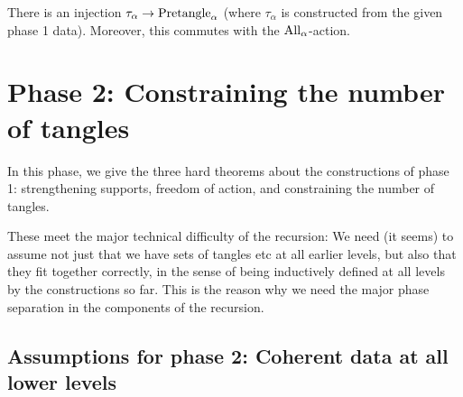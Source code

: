 \begin{definition}
  \label{def:embedding-into-pretangles}
  There is an injection $\tau_\alpha \to \mathrm{Pretangle}_\alpha$ (where $\tau_\alpha$ is constructed from the given phase 1 data).  Moreover, this commutes with the $\mathrm{All}_\alpha$-action.
\end{definition}

\newpage

\chapter{Phase 2: Constraining the number of tangles}

In this phase, we give the three hard theorems about the constructions of phase 1: strengthening supports, freedom of action, and constraining the number of tangles.

These meet the major technical difficulty of the recursion: We need (it seems) to assume not just that we have sets of tangles etc at all earlier levels, but also that they fit together correctly, in the sense of being inductively defined at all levels by the constructions so far.  This is the reason why we need the major phase separation in the components of the recursion.

\section{Assumptions for phase 2: Coherent data at all lower levels}

